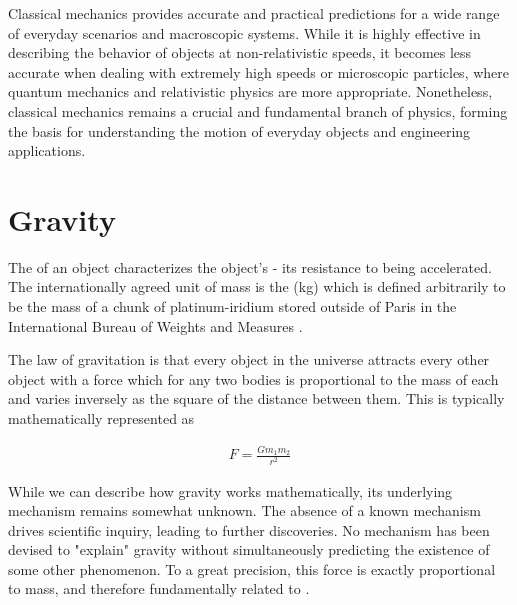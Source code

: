 Classical mechanics provides accurate and practical predictions for a wide range of everyday scenarios and macroscopic systems. While it is highly effective in describing the behavior of objects at non-relativistic speeds, it becomes less accurate when dealing with extremely high speeds or microscopic particles, where quantum mechanics and relativistic physics are more appropriate. Nonetheless, classical mechanics remains a crucial and fundamental branch of physics, forming the basis for understanding the motion of everyday objects and engineering applications.















\section{Gravity}

\begin{defn}{1}
The  of an object characterizes the object's  - its resistance to being accelerated. The internationally agreed unit of mass is the  (kg) which is defined arbitrarily to be the mass of a chunk of platinum-iridium stored outside of Paris in the International Bureau of Weights and Measures \cite{bib:Classical_Mechanics}.
\end{defn}

The law of gravitation is that every object in the universe attracts every other object with a force which for any two bodies is proportional to the mass of each and varies inversely as the square of the distance between them. This is typically mathematically represented as

\begin{align}
F = \frac{Gm_1m_2}{r^2}
\end{align}

While we can describe how gravity works mathematically, its underlying mechanism remains somewhat unknown. The absence of a known mechanism drives scientific inquiry, leading to further discoveries. No mechanism has been devised to "explain" gravity without simultaneously predicting the existence of some other phenomenon. To a great precision, this force is exactly proportional to mass, and therefore fundamentally related to .

